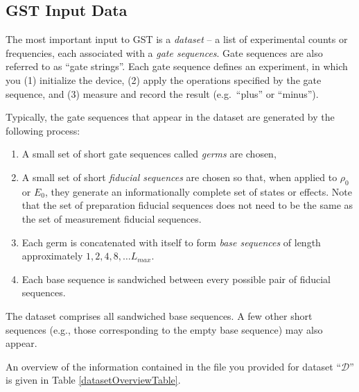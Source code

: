 \documentclass{article}[11pt]
\begin{document}
\subsection{GST Input Data}

The most important input to GST is a \emph{dataset} -- a list of experimental counts or frequencies, each associated with a \emph{gate sequences}.  Gate sequences are also referred to as ``gate strings''.  Each gate sequence defines an experiment, in which you (1) initialize the device, (2) apply the operations specified by the gate sequence, and (3) measure and record the result (e.g.~``plus'' or ``minus'').

Typically, the gate sequences that appear in the dataset are generated by the following process:
\begin{enumerate}
\item A small set of short gate sequences called \emph{germs} are chosen,
\item A small set of short \emph{fiducial sequences} are chosen so that, when applied to $\rho_0$ or $E_0$, they generate an informationally complete set of states or effects.  Note that the set of preparation fiducial sequences does not need to be the same as the set of measurement fiducial sequences.
\item Each germ is concatenated with itself to form \emph{base sequences} of length approximately $1,2,4,8,\ldots L_{max}$.
\item Each base sequence is sandwiched between every possible pair of fiducial sequences.
\end{enumerate}
The dataset comprises all sandwiched base sequences.  A few other short sequences (e.g., those corresponding to the empty base sequence) may also appear.

\iftoggle{LsAndGermsSet}{ The fiducial sequences and germs for \emph{this} dataset are given in Tables \ref{fiducialListTable} and \ref{germListTable}. }{ Fiducial sequence and germ information was not given for this report, and may not be applicable.}  An overview of the information contained in the file you provided for dataset ``$\mathcal{D}$'' is given in Table \ref{datasetOverviewTable}.  
\end{document}
